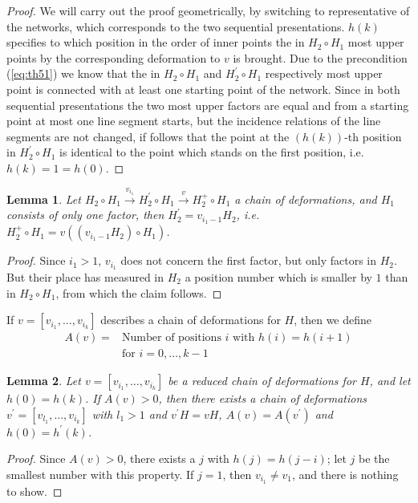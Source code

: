 \documentclass{article}
\newtheorem{lemma}{Lemma}
\begin{document}
\begin{proof}
We will carry out the proof geometrically, by switching to representative of the networks, which corresponds to the two sequential presentations.
$h(k)$ specifies to which position in the order of inner points the in $H_2 \circ H_1$ most upper points by the corresponding deformation to $v$ is brought.
Due to the precondition (\ref{eq:th51}) we know that the in $H_2 \circ H_1$ and $H^{\prime}_2 \circ H_1$ respectively most upper point 
is connected with at least one starting point of the network.
Since in both sequential presentations the two most upper factors are equal and from a starting point at most one line segment starts, 
but the incidence relations of the line segments are not changed, 
if follows that the point at the $(h(k))$-th position in $H^{\prime}_2 \circ H_1$ is identical to the point which stands on the first position, i.e. $h(k) = 1 = h(0)$.
\end{proof}

\begin{lemma}
Let $H_2 \circ H_1 \xrightarrow{v_{i_1}} H_2^{\prime} \circ H_1 \xrightarrow{v} H^{+}_2 \circ H_1$ a chain of deformations,
and $H_1$ consists of only one factor, then $H^{\prime}_2=v_{i_1 - 1} H_2$, i.e. $H^{+}_2 \circ H_1 = v ((v_{i_1-1} H_2) \circ H_1)$.  
\end{lemma}

\begin{proof}
Since $i_1 > 1$, $v_{i_1}$ does not concern the first factor, but only factors in $H_2$. 
But their place has measured in $H_2$ a position number which is smaller by $1$ than in $H_2 \circ H_1$, from which the claim follows.
\end{proof}

If $v=[v_{i_1}, \ldots, v_{i_k}]$ describes a chain of deformations for $H$, then we define
\[
\begin{array}{rc} 
   A(v) = & \mbox{Number of positions $i$ with $h(i) = h(i + 1)$} \\
          & \mbox{for $i = 0 , \ldots, k - 1$}
\end{array}
\]

\begin{lemma}
Let $v = [v_{i_1} , \ldots, v_{i_k}]$ be a reduced chain of deformations for $H$, 
and let $h(0) = h(k)$. If $A(v) > 0$, then there exists a chain of deformations $v^{\prime} = [ v_{l_1}, \ldots, v_{i_k}]$ with $l_1 > 1$ and $v^{\prime} H = v H$, 
$A(v) = A(v^{\prime})$ and $h(0)=h^{\prime}(k)$.
\end{lemma}
\begin{proof}
Since $A(v) > 0$, there exists a $j$ with $h(j) = h(j - i)$;
let $j$ be the smallest number with this property. If $j = 1$, then $v_{i_1} \neq v_1$, and there is nothing to show.
\end{proof}
\end{document}
